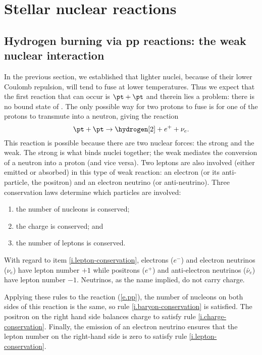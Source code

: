 \section{Stellar nuclear reactions}

\subsection{Hydrogen burning via pp reactions: the weak nuclear interaction}

In the previous section, we established that lighter nuclei, because of their lower Coulomb repulsion, will tend to fuse at lower temperatures. Thus we expect that the first reaction that can occur is $\pt+\pt$ and therein lies a problem: there is no bound state of \helium[2]. The only possible way for two protons to fuse is for one of the protons to transmute into a neutron, giving the reaction
\begin{equation}\label{e.pp}
	\pt + \pt \to \hydrogen[2] + e^{+} + \nu_{e}.
\end{equation}
This reaction is possible because there are two nuclear forces: the strong and the weak. The strong is what binds nuclei together; the weak mediates the conversion of a neutron into a proton (and vice versa). Two leptons are also involved (either emitted or absorbed) in this type of weak reaction: an electron (or its anti-particle, the positron) and an electron neutrino (or anti-neutrino). Three conservation laws determine which particles are involved:
\begin{enumerate}
\item\label{i.baryon-conservation} the number of nucleons is conserved;
\item\label{i.charge-conservation} the charge is conserved; and
\item\label{i.lepton-conservation} the number of leptons is conserved.
\end{enumerate}
With regard to item \ref{i.lepton-conservation}, electrons ($e^{-}$) and electron neutrinos ($\nu_{e}$) have lepton number $+1$ while positrons ($e^{+}$) and anti-electron neutrinos ($\bar{\nu}_{e}$) have lepton number $-1$. Neutrinos, as the name implied, do not carry charge.

Applying these rules to the reaction (\ref{e.pp}), the number of nucleons on both sides of this reaction is the same, so rule \ref{i.baryon-conservation} is satisfied. The positron on the right hand side balances charge to satisfy rule \ref{i.charge-conservation}. Finally, the emission of an electron neutrino ensures that the lepton number on the right-hand side is zero to satisfy rule \ref{i.lepton-conservation}.


